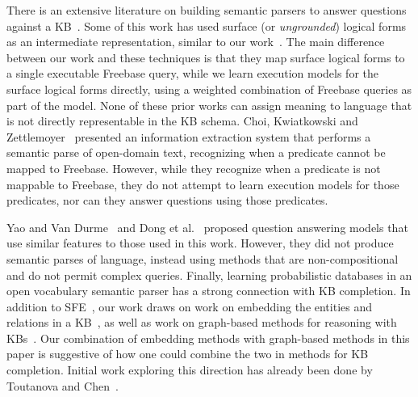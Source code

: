 \documentclass[11pt,letterpaper]{article}
\begin{document}
There is an extensive literature on building semantic parsers to answer questions against a
KB~\cite{zettlemoyer-2005-ccg,berant-2013-semantic-parsing-qa,%
krishnamurthy-2012-semantic-parsing,li-2015-semantic-parsing-scfg}.  Some of this work has used
surface (or \emph{ungrounded}) logical forms as an intermediate representation, similar to our
work~\cite{kwiatkowski-2013-ontology-matching,reddy-2014-graph-matching,%
yih-2015-semparse-query-graph,reddy-2016-dep-lambda}.  The main difference between our work and
these techniques is that they map surface logical forms to a single executable Freebase query,
while we learn execution models for the surface logical forms directly, using a weighted
combination of Freebase queries as part of the model.  None of these prior works can assign meaning
to language that is not directly representable in the KB schema.  Choi, Kwiatkowski and Zettlemoyer~
presented an information extraction system that performs a semantic parse of open-domain text,
recognizing when a predicate cannot be mapped to Freebase.  However, while they recognize when a
predicate is not mappable to Freebase, they do not attempt to learn execution models for those
predicates, nor can they answer questions using those predicates.

Yao and Van Durme~ and Dong et
al.~ proposed question answering models that use similar
features to those used in this work.  However, they did not produce semantic parses of language,
instead using methods that are non-compositional and do not permit complex queries.  Finally, learning probabilistic databases in an open vocabulary semantic parser has a strong
connection with KB completion.  In addition to SFE~\cite{gardner-2015-sfe}, our work draws on work
on embedding the entities and relations in a
KB~\cite{riedel-2013-mf-universal-schema,nickel-2011-rescal,%
bordes-2013-transe,nickel-2014-are,toutanova-2015-joint-text-kb-embedding}, as well as work on
graph-based methods for reasoning with
KBs~\cite{lao-2010-original-pra,gardner-2014-vector-space-pra,neelakantan-2015-rnn-kbc,%
bornea-2015-relational-path-mining}.  Our combination of embedding methods with graph-based methods
in this paper is suggestive of how one could combine the two in methods for KB completion.  Initial
work exploring this direction has already been done by Toutanova and
Chen~.


\vspace{-3.54mm}
\end{document}
